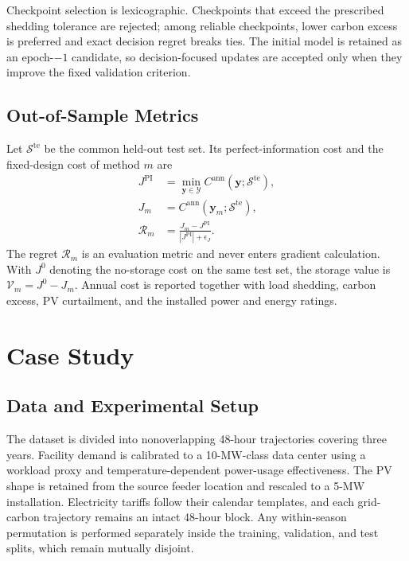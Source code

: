 \documentclass[times]{elsarticle}
\begin{document}
Checkpoint selection is lexicographic. Checkpoints that exceed the prescribed
shedding tolerance are rejected; among reliable checkpoints, lower carbon
excess is preferred and exact decision regret breaks ties. The initial model is
retained as an epoch-$-1$ candidate, so decision-focused updates are accepted
only when they improve the fixed validation criterion.

\subsection{Out-of-Sample Metrics}

Let $\mathcal S^{\mathrm{te}}$ be the common held-out test set. Its
perfect-information cost and the fixed-design cost of method $m$ are
\begin{align}
J^{\mathrm{PI}}&=\min_{\bm y\in\mathcal Y}
C^{\mathrm{ann}}(\bm y;\mathcal S^{\mathrm{te}}),
\label{eq:test_pi}\\
J_m&=C^{\mathrm{ann}}(\bm y_m;\mathcal S^{\mathrm{te}}),
\label{eq:test_cost}\\
\mathcal R_m&=\frac{J_m-J^{\mathrm{PI}}}{|J^{\mathrm{PI}}|+\epsilon_J}.
\label{eq:regret}
\end{align}
The regret $\mathcal R_m$ is an evaluation metric and never enters gradient
calculation. With $J^0$ denoting the no-storage cost on the same test set, the
storage value is $\mathcal V_m=J^0-J_m$. Annual cost is reported together with
load shedding, carbon excess, PV curtailment, and the installed power and energy
ratings.

\section{Case Study}
\label{sec:case}

\subsection{Data and Experimental Setup}

The dataset is divided into nonoverlapping 48-hour trajectories covering three
years. Facility demand is calibrated to a 10-MW-class data center using a
workload proxy and temperature-dependent power-usage effectiveness. The PV
shape is retained from the source feeder location and rescaled to a 5-MW
installation. Electricity tariffs follow their calendar templates, and each
grid-carbon trajectory remains an intact 48-hour block. Any within-season
permutation is performed separately inside the training, validation, and test
splits, which remain mutually disjoint.
\end{document}
